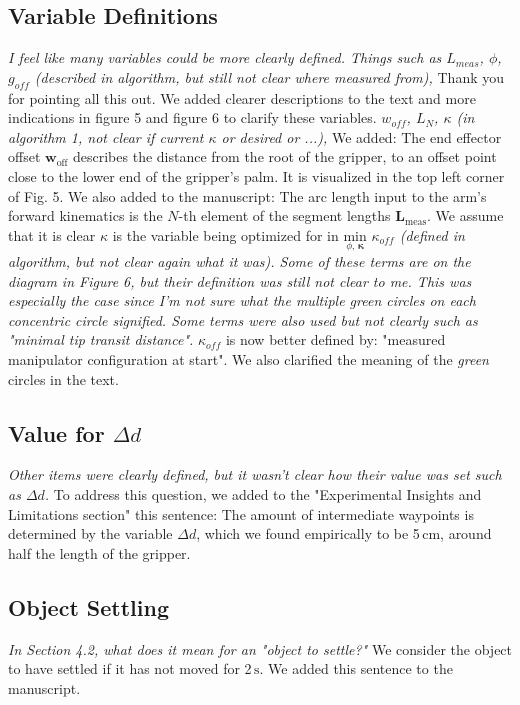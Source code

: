 \documentclass[letterpaper, 10 pt, twocolumn, conference]{article}
\newcommand{\unit}[1]{\ensuremath{\, \mathrm{#1}}} %
\begin{document}
\subsection{Variable Definitions}
\textit{I feel like many variables could be more clearly defined. Things such as $L_{meas}$, $\phi$, $g_{off}$ (described in algorithm, but still not clear where measured from),}
%
Thank you for pointing all this out. We added clearer descriptions to the text and more indications in figure 5 and figure 6 to clarify these variables.
%
\textit{$w_{off}$, $L_N$, $\kappa$ (in algorithm 1, not clear if current $\kappa$ or desired or ...),}
%
We added: The end effector offset $\mathbf{w}_{\textrm{off}}$ describes the distance from the root of the gripper, to an offset point close to the lower end of the gripper's palm. It is visualized in the top left corner of Fig. 5.
We also added to the manuscript: The arc length input to the arm's forward kinematics is the $N$-th element of the segment lengths $\mathbf{L}_{\textrm{meas}}$.
%
We assume that it is clear 
$\kappa$ is the variable being optimized for in $\underset{\phi, \, \boldsymbol{\kappa}}{\text{min}}$
%
\textit{$\kappa_{off}$ (defined in algorithm, but not clear again what it was). Some of these terms are on the diagram in Figure 6, but their definition was still not clear to me. This was especially the case since I'm not sure what the multiple green circles on each concentric circle signified. Some terms were also used but not clearly such as "minimal tip transit distance".}
%
$\kappa_{off}$  is now better defined by: "measured manipulator configuration at start". We also clarified the meaning of the \emph{green} circles in the text.
%

%
\subsection{Value for $\Delta d$}
\textit{Other items were clearly defined, but it wasn't clear how their value was set such as $\Delta d$.}
%
To address this question, we added to the "Experimental Insights and Limitations section" this sentence: 
The amount of intermediate waypoints is determined by the variable $\Delta d$, which we found empirically to be 5\unit{cm}, around half the length of the gripper.
%
\subsection{Object Settling}
\textit{In Section 4.2, what does it mean for an "object to settle?"}
%
We consider the object to have settled if it has not moved for 2\unit{s}. We added this sentence to the manuscript.
%
\end{document}
